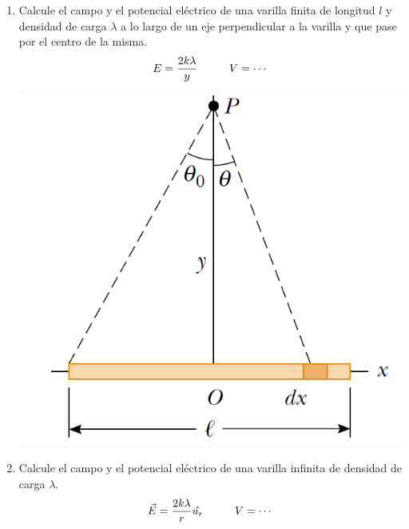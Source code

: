 \documentclass[11pt,twocolumn]{article}
\begin{document}
\begin{enumerate}
\item Calcule el campo y el potencial eléctrico de una varilla finita de longitud $l$ y densidad de carga $\lambda$ a lo largo de un eje perpendicular a la varilla y que pase por el centro de la misma.
\begin{displaymath}
E=\dfrac{2k\lambda}{y} \hspace{1.0 cm} V=\cdots
\end{displaymath}
{
\begin{center}
\includegraphics[scale=0.2]{varilla-finita}
\end{center}
}

\item Calcule el campo y el potencial eléctrico de una varilla infinita de densidad de carga $\lambda$.
\begin{displaymath}
\vec{E}=\dfrac{2k\lambda}{r}\hat{u_{r}} \hspace{1.0 cm} V=\cdots
\end{displaymath}


\end{enumerate}
\end{document}
